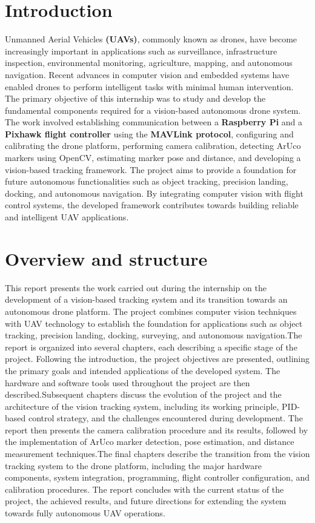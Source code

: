 \documentclass[12pt]{article}
\begin{document}
\newpage
\tableofcontents
\thispagestyle{introstyle}
\newpage
\section{Introduction}
\thispagestyle{introstyle}
\large{Unmanned Aerial Vehicles \textbf{(UAVs)}, commonly known as drones, have become increasingly important in applications such as surveillance, infrastructure inspection, environmental monitoring, agriculture, mapping, and autonomous navigation. Recent advances in computer vision and embedded systems have enabled drones to perform intelligent tasks with minimal human intervention.\\
The primary objective of this internship was to study and develop the fundamental components required for a vision-based autonomous drone system. The work involved establishing communication between a \textbf{Raspberry Pi} and a \textbf{Pixhawk flight controller} using the \textbf{MAVLink protocol}, configuring and calibrating the drone platform, performing camera calibration, detecting ArUco markers using OpenCV, estimating marker pose and distance, and developing a vision-based tracking framework.
The project aims to provide a foundation for future autonomous functionalities such as object tracking, precision landing, docking, and autonomous navigation. By integrating computer vision with flight control systems, the developed framework contributes towards building reliable and intelligent UAV applications.

\newpage
\section{Overview and structure}
\thispagestyle{introstyle}
This report presents the work carried out during the internship on the development of a vision-based tracking system and its transition towards an autonomous drone platform. The project combines computer vision techniques with UAV technology to establish the foundation for applications such as object tracking, precision landing, docking, surveying, and autonomous navigation.The report is organized into several chapters, each describing a specific stage of the project. Following the introduction, the project objectives are presented, outlining the primary goals and intended applications of the developed system. The hardware and software tools used throughout the project are then described.Subsequent chapters discuss the evolution of the project and the architecture of the vision tracking system, including its working principle, PID-based control strategy, and the challenges encountered during development. The report then presents the camera calibration procedure and its results, followed by the implementation of ArUco marker detection, pose estimation, and distance measurement techniques.The final chapters describe the transition from the vision tracking system to the drone platform, including the major hardware components, system integration, programming, flight controller configuration, and calibration procedures. The report concludes with the current status of the project, the achieved results, and future directions for extending the system towards fully autonomous UAV operations.

}
\end{document}
